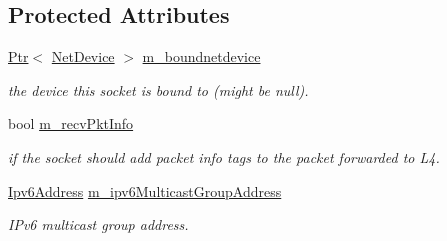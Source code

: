 \subsection*{Protected Attributes}
\begin{DoxyCompactItemize}
\item 
\hyperlink{classns3_1_1Ptr}{Ptr}$<$ \hyperlink{classns3_1_1NetDevice}{Net\+Device} $>$ \hyperlink{classns3_1_1Socket_a9781d8dfdb5e9364d5dce8f53b768bb5}{m\+\_\+boundnetdevice}
\begin{DoxyCompactList}\small\item\em the device this socket is bound to (might be null). \end{DoxyCompactList}\item 
bool \hyperlink{classns3_1_1Socket_a760f9005e248682fe83c0332189d782f}{m\+\_\+recv\+Pkt\+Info}
\begin{DoxyCompactList}\small\item\em if the socket should add packet info tags to the packet forwarded to L4. \end{DoxyCompactList}\item 
\hyperlink{classns3_1_1Ipv6Address}{Ipv6\+Address} \hyperlink{classns3_1_1Socket_a5745d9cdf891f3f0c06b124c4b679ef9}{m\+\_\+ipv6\+Multicast\+Group\+Address}
\begin{DoxyCompactList}\small\item\em I\+Pv6 multicast group address. \end{DoxyCompactList}\end{DoxyCompactItemize}
